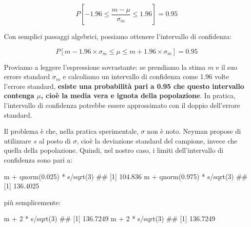 \documentclass[a4paper,12pt,oneside]{book}
\newenvironment{Shaded}{}{}
\newcommand{\KeywordTok}[1]{#1}
\newcommand{\DecValTok}[1]{#1}
\newcommand{\FloatTok}[1]{#1}
\newcommand{\StringTok}[1]{#1}
\newcommand{\CommentTok}[1]{#1}
\newcommand{\OperatorTok}[1]{#1}
\newcommand{\NormalTok}[1]{#1}
\begin{document}
\[P \left[ -1.96 \le \frac{m - \mu }{\sigma_m} \le 1.96 \right] = 0.95\]

Con semplici passaggi algebrici, possiamo ottenere l'intervallo di confidenza:

\[P \left[ m -1.96 \times \sigma_m \le \mu \le m + 1.96 \times \sigma_m \right] = 0.95\]

Proviamo a leggere l'espressione sovrastante: se prendiamo la stima \(m\) e il suo errore standard \(\sigma_m\) e calcoliamo un intervallo di confidenza come 1.96 volte l'errore standard, \textbf{esiste una probabilità pari a 0.95 che questo intervallo contenga \(\mu\), cioè la media vera e ignota della popolazione}. In pratica, l'intervallo di confidenza potrebbe essere approssimato con il doppio dell'errore standard.

Il problema è che, nella pratica sperimentale, \(\sigma\) non è noto. Neyman propose di utilizzare \(s\) al posto di \(\sigma\), cioè la deviazione standard del campione, invece che quella della popolazione. Quindi, nel nostro caso, i limiti dell'intervallo di confidenza sono pari a:

\begin{Shaded}
\begin{Highlighting}[]
\NormalTok{m }\OperatorTok{+}\StringTok{ }\KeywordTok{qnorm}\NormalTok{(}\FloatTok{0.025}\NormalTok{) }\OperatorTok{*}\StringTok{ }\NormalTok{s}\OperatorTok{/}\KeywordTok{sqrt}\NormalTok{(}\DecValTok{3}\NormalTok{)}
\CommentTok{## [1] 104.836}
\NormalTok{m }\OperatorTok{+}\StringTok{ }\KeywordTok{qnorm}\NormalTok{(}\FloatTok{0.975}\NormalTok{) }\OperatorTok{*}\StringTok{ }\NormalTok{s}\OperatorTok{/}\KeywordTok{sqrt}\NormalTok{(}\DecValTok{3}\NormalTok{)}
\CommentTok{## [1] 136.4025}
\end{Highlighting}
\end{Shaded}

più semplicemente:

\begin{Shaded}
\begin{Highlighting}[]
\NormalTok{m }\OperatorTok{+}\StringTok{ }\DecValTok{2} \OperatorTok{*}\StringTok{ }\NormalTok{s}\OperatorTok{/}\KeywordTok{sqrt}\NormalTok{(}\DecValTok{3}\NormalTok{)}
\CommentTok{## [1] 136.7249}
\NormalTok{m }\OperatorTok{+}\StringTok{ }\DecValTok{2} \OperatorTok{*}\StringTok{ }\NormalTok{s}\OperatorTok{/}\KeywordTok{sqrt}\NormalTok{(}\DecValTok{3}\NormalTok{)}
\CommentTok{## [1] 136.7249}
\end{Highlighting}
\end{Shaded}
\end{document}
